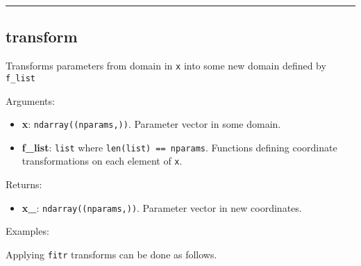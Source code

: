 \begin{center}\rule{0.5\linewidth}{\linethickness}\end{center}

\subsection{transform}\label{transform}

\begin{Shaded}
\begin{Highlighting}[]
\end{Highlighting}
\end{Shaded}

Transforms parameters from domain in \texttt{x} into some new domain
defined by \texttt{f\_list}

Arguments:

\begin{itemize}
\tightlist
\item
  \textbf{x}: \texttt{ndarray((nparams,))}. Parameter vector in some
  domain.
\item
  \textbf{f\_list}: \texttt{list} where \texttt{len(list)\ ==\ nparams}.
  Functions defining coordinate transformations on each element of
  \texttt{x}.
\end{itemize}

Returns:

\begin{itemize}
\tightlist
\item
  \textbf{x\_}: \texttt{ndarray((nparams,))}. Parameter vector in new
  coordinates.
\end{itemize}

Examples:

Applying \texttt{fitr} transforms can be done as follows.

\begin{Shaded}
\begin{Highlighting}[]

\OperatorTok{=}\NormalTok{, }\OperatorTok{=}\NormalTok{)}
\OperatorTok{=}
\end{Highlighting}
\end{Shaded}

